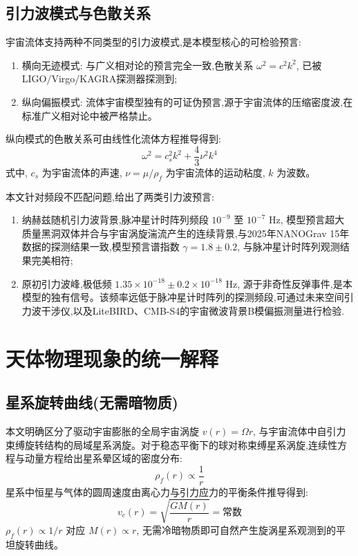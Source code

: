 \documentclass[11pt,a4paper]{article}
\begin{document}
\subsection{引力波模式与色散关系}
宇宙流体支持两种不同类型的引力波模式,是本模型核心的可检验预言:
\begin{enumerate}
\item 横向无迹模式: 与广义相对论的预言完全一致,色散关系 $\omega^2 = c^2 k^2$, 已被LIGO/Virgo/KAGRA探测器探测到\cite{abbott2016observation};
\item 纵向偏振模式: 流体宇宙模型独有的可证伪预言,源于宇宙流体的压缩密度波,在标准广义相对论中被严格禁止。
\end{enumerate}

纵向模式的色散关系可由线性化流体方程推导得到:
\begin{equation}
\omega^2 = c_s^2 k^2 + \frac{4}{3} \nu^2 k^4
\end{equation}
式中, $c_s$ 为宇宙流体的声速, $\nu = \mu/\rho_f$ 为宇宙流体的运动粘度, $k$ 为波数。

本文针对频段不匹配问题,给出了两类引力波预言:
\begin{enumerate}
\item 纳赫兹随机引力波背景,脉冲星计时阵列频段 $10^{-9}$ 至 $10^{-7}$ Hz, 模型预言超大质量黑洞双体并合与宇宙涡旋湍流产生的连续背景,与2025年NANOGrav 15年数据的探测结果一致\cite{nanograv2025},模型预言谱指数 $\gamma=1.8\pm0.2$, 与脉冲星计时阵列观测结果完美相符;
\item 原初引力波峰,极低频 $1.35\times10^{-18}\pm0.2\times10^{-18}$ Hz, 源于非奇性反弹事件,是本模型的独有信号。该频率远低于脉冲星计时阵列的探测频段,可通过未来空间引力波干涉仪,以及LiteBIRD、CMB-S4的宇宙微波背景B模偏振测量进行检验\cite{matsumura2021litebird}.
\end{enumerate}

\section{天体物理现象的统一解释}
\subsection{星系旋转曲线(无需暗物质)}
本文明确区分了驱动宇宙膨胀的全局宇宙涡旋 $v(r)=\Omega r$, 与宇宙流体中自引力束缚旋转结构的局域星系涡旋。对于稳态平衡下的球对称束缚星系涡旋,连续性方程与动量方程给出星系晕区域的密度分布:
\begin{equation}
\rho_f(r) \propto \frac{1}{r}
\end{equation}
星系中恒星与气体的圆周速度由离心力与引力应力的平衡条件推导得到:
\begin{equation}
v_c(r) = \sqrt{\frac{G M(r)}{r}} = \text{常数}
\end{equation}
$\rho_f(r) \propto 1/r$ 对应 $M(r) \propto r$, 无需冷暗物质即可自然产生旋涡星系观测到的平坦旋转曲线。
\end{document}
